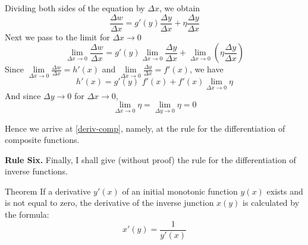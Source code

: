 Dividing both sides of the equation by $\Delta x$,	 we obtain
\begin{equation*}%
\frac{\Delta w}{\Delta x} = g'(y) \frac{\Delta y}{\Delta x} + \eta \frac{\Delta y}{\Delta x}
\end{equation*}
Next we pass to the limit for $\Delta x \to 0$
\begin{equation*}%
\lim\limits_{\Delta x \to 0} \frac{\Delta w}{\Delta x} = g'(y) \lim\limits_{\Delta x \to 0} \frac{\Delta y}{\Delta x} + \lim\limits_{\Delta x \to 0} \left( \eta \frac{\Delta y}{\Delta x} \right)
\end{equation*}
Since $\lim\limits_{\Delta x \to 0} \frac{\Delta w}{\Delta x} = h' (x)$ and $\lim\limits_{\Delta x \to 0} \frac{\Delta y}{\Delta x} = f'(x)$, we have
\begin{equation*}%
h'(x) = g'(y) \,\, f'(x) + f'(x) \lim\limits_{\Delta  x \to 0} \eta 
\end{equation*}
And since $\Delta y \to 0$ for  $\Delta x \to 0$, 
\begin{equation*}%
\lim\limits_{\Delta  x \to 0} \eta = \lim\limits_{\Delta  y \to 0} \eta = 0
\end{equation*}

Hence we arrive at \eqref{deriv-comp}, namely, at the rule for the differentiation of composite functions.

\textbf{Rule Six.} Finally, I shall give (without proof) the rule for the differentiation of inverse functions.

\begin{mytheo}{Theorem}
If a derivative $y' (x)$ of an initial monotonic function $y (x)$ exists and is not equal to zero, the derivative of the inverse junction $x (y)$ is calculated by the formula:
\begin{equation}%
x' (y) = \frac{1}{ y' (x)}
 \label{deriv-comp}
\end{equation}
\end{mytheo}

